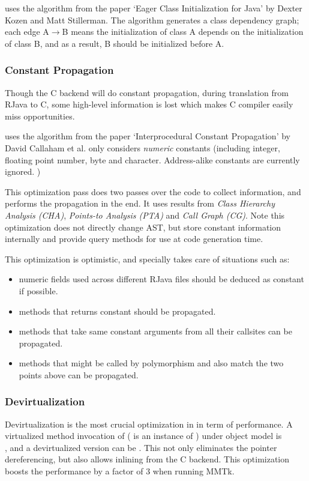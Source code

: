 \documentclass[12pt]{article}
\begin{document}
\rjc uses the algorithm from the paper `Eager Class Initialization for Java' by Dexter Kozen
and Matt Stillerman. The algorithm generates a class dependency graph; each edge A$\rightarrow$B
means the initialization of class A depends on the initialization of 
class B, and as a result, B should be initialized
before A. 

\subsubsection{Constant Propagation}

Though the C backend will do constant propagation, during translation from
RJava to C, some high-level information is lost which makes C compiler easily
miss opportunities. 

\rjc uses the algorithm from the paper `Interprocedural Constant Propagation'
by David Callaham et al. \rjc only considers \emph{numeric} constants (including integer,
floating point number, byte and character. Address-alike constants are currently
ignored. )

This optimization pass does two passes over the code to collect information, 
and performs the propagation in the end. 
It uses results from \emph{Class Hierarchy Analysis (CHA)}, 
\emph{Points-to Analysis (PTA)} and \emph{Call Graph (CG)}. Note
this optimization does not directly change AST, but store constant information
internally and provide query methods for use at code generation time. 

This optimization is optimistic, and specially takes care of situations such as:
\begin{itemize}
\item numeric  fields used across different RJava files 
should be deduced as constant if possible. 
\item methods that returns constant should be propagated.
\item methods that take same constant arguments from all their callsites can be
propagated. 
\item methods that might be called by polymorphism and also match the two points
above can be propagated.  
\end{itemize}

\subsubsection{Devirtualization}

Devirtualization is the most crucial optimization in \rjc in term of performance. 
A virtualized method invocation of  
( is an instance of ) under \rjc object model is \\
,
and a devirtualized version can be . 
This not only eliminates the pointer dereferencing, but also allows inlining
from the C backend. This optimization boosts the performance by a factor of 3
when running MMTk. 
\end{document}
